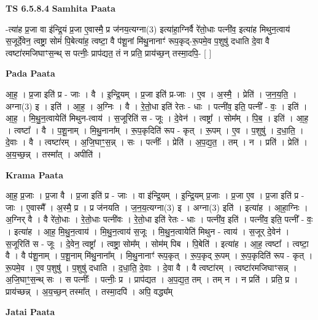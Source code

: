 \documentclass[17pt]{extarticle}
\begin{document}
\textbf{TS 6.5.8.4 } \newline
\textbf{Samhita Paata} \newline

-त्या॑ह प्र॒जा वा इ॑न्द्रि॒यं प्र॒जा ए॒वास्मै॒ प्र ज॑नय॒त्यग्ना(3) इत्या॑हा॒ग्निर्वै रे॑तो॒धाः पत्नी॑व॒ इत्या॑ह मिथुन॒त्वाय॑ स॒जूर्दे॒वेन॒ त्वष्ट्रा॒ सोमं॑ पि॒बेत्या॑ह॒ त्वष्टा॒ वै प॑शू॒नां मि॑थु॒नानाꣳ॑ रूप॒कृद्-रू॒पमे॒व प॒शुषु॑ दधाति दे॒वा वै त्वष्टा॑रमजिघाꣳस॒न्थ् स पत्नीः॒ प्राप॑द्यत॒ तं न प्रति॒ प्राय॑च्छ॒न् तस्मा॒दपि॒- [  ] \newline

\textbf{Pada Paata} \newline

आ॒ह॒ । प्र॒जा इति॑ प्र - जाः । वै । इ॒न्द्रि॒यम् । प्र॒जा इति॑ प्र-जाः । ए॒व । अ॒स्मै॒ । प्रेति॑ । ज॒न॒य॒ति॒ । अग्ना(3) इ । इति॑ । आ॒ह॒ । अ॒ग्निः । वै । रे॒तो॒धा इति॑ रेतः - धाः । पत्नी॑व॒ इति॒ पत्नी᳚ - वः॒ । इति॑ । आ॒ह॒ । मि॒थु॒न॒त्वायेति॑ मिथुन-त्वाय॑ । स॒जूरिति॑ स - जूः । दे॒वेन॑ । त्वष्ट्रा᳚ । सोम᳚म् । पि॒ब॒ । इति॑ । आ॒ह॒ । त्वष्टा᳚ । वै । प॒शू॒नाम् । मि॒थु॒नाना᳚म् । रू॒प॒कृदिति॑ रूप - कृत् । रू॒पम् । ए॒व । प॒शुषु॑ । द॒धा॒ति॒ । दे॒वाः । वै । त्वष्टा॑रम् । अ॒जि॒घाꣳ॒॒स॒न्न् । सः । पत्नीः᳚ । प्रेति॑ । अ॒प॒द्य॒त॒ । तम् । न । प्रति॑ । प्रेति॑ । अ॒य॒च्छ॒न्न् । तस्मा᳚त् । अपीति॑ ।  \newline


\textbf{Krama Paata} \newline

आ॒ह॒ प्र॒जाः । प्र॒जा वै । प्र॒जा इति॑ प्र - जाः । वा इ॑न्द्रि॒यम् । इ॒न्द्रि॒यम् प्र॒जाः । प्र॒जा ए॒व । प्र॒जा इति॑ प्र - जाः । ए॒वास्मै᳚ । अ॒स्मै॒ प्र । प्र ज॑नयति । ज॒न॒य॒त्यग्ना(3) इ । अग्ना(3) इति॑ । इत्या॑ह । आ॒हा॒ग्निः । अ॒ग्निर् वै । वै रे॑तो॒धाः । रे॒तो॒धाः पत्नी॑वः । रे॒तो॒धा इति॑ रेतः - धाः । पत्नी॑व॒ इति॑ । पत्नी॑व॒ इति॒ पत्नी᳚ - वः॒ । इत्या॑ह । आ॒ह॒ मि॒थु॒न॒त्वाय॑ । मि॒थु॒न॒त्वाय॑ स॒जूः । मि॒थु॒न॒त्वायेति॑ मिथुन - त्वाय॑ । स॒जूर् दे॒वेन॑ । स॒जूरिति॑ स - जूः । दे॒वेन॒ त्वष्ट्रा᳚ । त्वष्ट्रा॒ सोम᳚म् । सोम॑म् पिब । पि॒बेति॑ । इत्या॑ह । आ॒ह॒ त्वष्टा᳚ । त्वष्टा॒ वै । वै प॑शू॒नाम् । प॒शू॒नाम् मि॑थु॒नाना᳚म् । मि॒थु॒नानाꣳ॑ रूप॒कृत् । रू॒प॒कृद् रू॒पम् । रू॒प॒कृदिति॑ रूप - कृत् । रू॒पमे॒व । ए॒व प॒शुषु॑ । प॒शुषु॑ दधाति । द॒धा॒ति॒ दे॒वाः । दे॒वा वै । वै त्वष्टा॑रम् । त्वष्टा॑रमजिघाꣳसन्न् । अ॒जि॒घाꣳ॒॒स॒न्थ् सः । स पत्नीः᳚ । पत्नीः॒ प्र । प्राप॑द्यत । अ॒प॒द्य॒त॒ तम् । तम् न । न प्रति॑ । प्रति॒ प्र । प्राय॑च्छन्न् । अ॒य॒च्छ॒न् तस्मा᳚त् । तस्मा॒दपि॑ । अपि॒ वद्ध्य᳚म् \newline

\textbf{Jatai Paata} \newline
\end{document}
